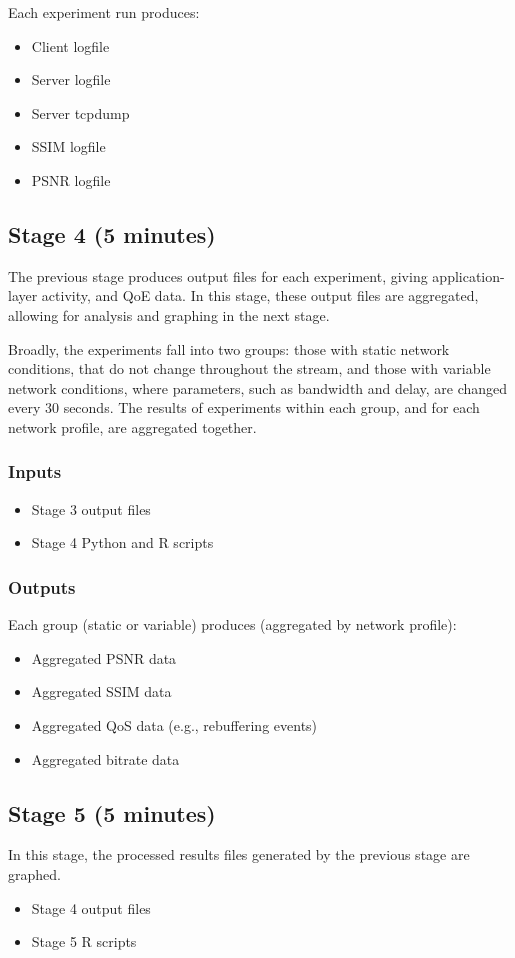 \documentclass[sigconf]{acmart}
\begin{document}
Each experiment run produces:
\begin{itemize}
\item Client logfile
\item Server logfile
\item Server tcpdump
\item SSIM logfile
\item PSNR logfile
\end{itemize}

\subsection*{Stage 4 (5 minutes)}
The previous stage produces output files for each experiment, giving application-layer
activity, and QoE data. In this stage, these output files are aggregated,
allowing for analysis and graphing in the next stage.

Broadly, the experiments fall into two groups: those with static network conditions, that
do not change throughout the stream, and those with variable network conditions, where
parameters, such as bandwidth and delay, are changed every 30 seconds. The results of
experiments within each group, and for each network profile, are aggregated together.

\subsubsection*{Inputs}
\begin{itemize}
\item Stage 3 output files
\item Stage 4 Python and R scripts
\end{itemize}
\subsubsection*{Outputs}

Each group (static or variable) produces (aggregated by network profile):
\begin{itemize}
\item Aggregated PSNR data
\item Aggregated SSIM data
\item Aggregated QoS data (e.g., rebuffering events)
\item Aggregated bitrate data
\end{itemize}

\subsection*{Stage 5 (5 minutes)}
In this stage, the processed results files generated by the previous stage are graphed.
\begin{itemize}
\item Stage 4 output files
\item Stage 5 R scripts
\end{itemize}
\end{document}
